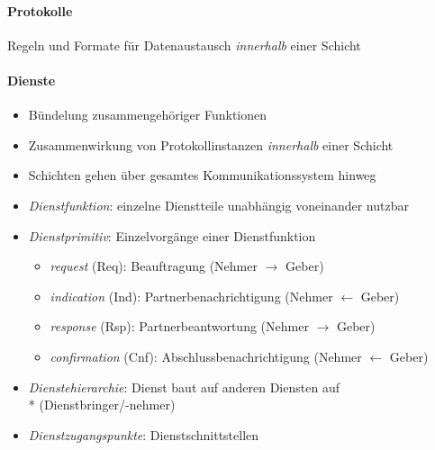 \paragraph{Protokolle}
Regeln und Formate für Datenaustausch \emph{innerhalb} einer Schicht

\paragraph{Dienste}
\begin{itemize}
  \item Bündelung zusammengehöriger Funktionen
  \item Zusammenwirkung von Protokollinstanzen \emph{innerhalb} einer Schicht
  \item Schichten gehen über gesamtes Kommunikationssystem hinweg
  \item \emph{Dienstfunktion}: einzelne Dienstteile unabhängig voneinander nutzbar
  \item \emph{Dienstprimitiv}: Einzelvorgänge einer Dienstfunktion
  \begin{itemize}
    \item \emph{request} (Req): Beauftragung (Nehmer \( \to \) Geber)
    \item \emph{indication} (Ind): Partnerbenachrichtigung (Nehmer \( \leftarrow \) Geber)
    \item \emph{response} (Rsp): Partnerbeantwortung (Nehmer \( \to \) Geber)
    \item \emph{confirmation} (Cnf): Abschlussbenachrichtigung (Nehmer \( \leftarrow  \) Geber)
  \end{itemize}
  \item \emph{Dienstehierarchie}: Dienst baut auf anderen Diensten auf \\* (Dienstbringer/-nehmer)
  \item \emph{Dienstzugangspunkte}: Dienstschnittstellen
\end{itemize}

